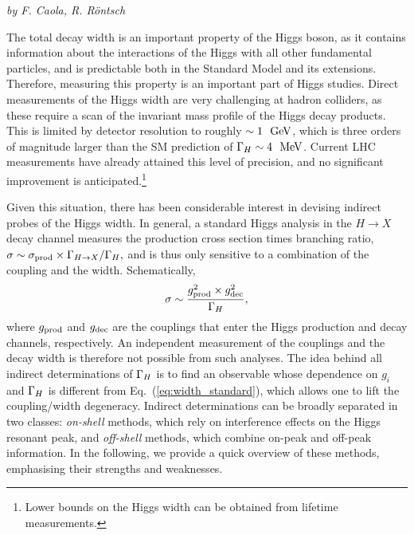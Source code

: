 \begin{center}{\it by F. Caola, 
R. R\"ontsch} \end{center}

The total decay width is an important property of the Higgs boson,
as it contains information about the interactions of the Higgs with all other
fundamental particles, and is predictable both in the Standard Model and its extensions.
Therefore, measuring this property is an important part of Higgs studies. 
%
Direct measurements of the Higgs width are very challenging at hadron colliders,
as these require a scan of the invariant mass profile of the Higgs decay
products.
This is limited by detector resolution to roughly $\sim 1~{\rm ~\text{GeV}}$,
which is  three orders of magnitude larger than the SM prediction of  ${\Gamma_H}\sim 4~{\rm ~\text{MeV}}$.
Current LHC measurements have already attained this level of precision, and no significant improvement
is anticipated.\footnote{Lower bounds
on the Higgs width can be obtained
from lifetime measurements.}

Given this situation, there has been considerable interest in devising indirect probes of the
Higgs width. In general, a standard Higgs analysis in the $H\to X$ decay channel 
measures the production cross section times branching ratio,
$\sigma \sim \sigma_{\rm prod}\times {\Gamma_{H\to X}}/{\Gamma_H},$
and is thus  only sensitive to a combination of the coupling and the width. Schematically,
\begin{equation}
\sigma \sim \frac{g_{\rm prod}^2 \times g_{\rm dec}^2}{{\Gamma_H}},
\label{eq:width_standard}
\end{equation}
where $g_{\rm prod}$ and $g_{\rm dec}$ are the couplings that enter the Higgs production
and decay channels, respectively. An independent measurement of the couplings and the decay width is 
therefore not possible from such analyses. The idea
behind all indirect determinations of ${\Gamma_H}$ is to find an observable whose dependence on
$g_i$ and ${\Gamma_H}$ is different from Eq.~(\ref{eq:width_standard}), which allows one
to lift the coupling/width degeneracy. Indirect determinations can be broadly separated in two
classes: \emph{on-shell} methods, which rely on interference effects on the Higgs resonant
peak, and \emph{off-shell} methods, which combine on-peak and off-peak information. In the
following, we provide a quick overview of these methods, emphasising their strengths and weaknesses. 

